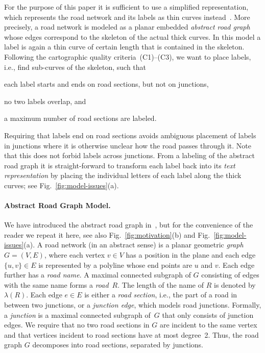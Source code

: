 \documentclass[a4paper,11pt]{article}
\begin{document}
For the purpose of this paper it is sufficient to use a simplified representation, which represents the road network
and its labels as thin curves instead~\cite{rlTheory}. More precisely, a road
network is modeled as a planar embedded \emph{abstract road graph} whose edges
correspond to the skeleton of the actual thick curves.  In this model a
label is again a thin curve of certain length that is contained in the
skeleton. Following the cartographic quality criteria~(C1)--(C3),
we want to place labels, i.e., find sub-curves of the skeleton,
such that
\begin{inparaenum}[(1)]
\item each label starts and ends on road sections, but not on junctions,
\item no two labels overlap, and
\item a maximum number of road sections are labeled. \end{inparaenum}
Requiring that labels end on road sections avoids ambiguous placement
of labels in junctions where it is otherwise unclear how the road passes through
it. Note that this does not forbid labels across junctions. From a
labeling of the abstract road graph it is straight-forward to
transform each label back into its \emph{text representation} by
placing the individual letters of each label along the thick curves; see
Fig.~\ref{fig:model-issues}(a).


\paragraph{Abstract Road Graph Model.}
We have introduced the abstract road graph in~\cite{rlTheory}, but for
the convenience of the reader we repeat it here, see also
Fig.~\ref{fig:motivation}(b) and Fig.~\ref{fig:model-issues}(a).   A road
network (in an abstract sense) is a planar geometric \emph{graph}
$G=(V,E)$, where each vertex $v\in V$ has a position in the plane and
each edge~$\{u,v\}\in E$ is represented by a polyline whose end points
are $u$ and $v$.  Each edge further has a \emph{road name}. A
maximal connected subgraph of $G$ consisting of edges with the same name
forms a \emph{road}~$R$. The length of the name of $R$ is denoted by~$\lambda(R)$.
Each edge $e \in E$ is either a \emph{road section}, i.e., the part of a road in between two junctions, or a \emph{junction edge}, which
models road junctions. Formally, a \emph{junction} is a maximal connected
subgraph of~$G$ that only consists of junction edges. We require that no two road sections in $G$ are incident to the same vertex and that vertices incident to road sections have at
most degree~2. Thus, the road graph $G$ decomposes into road sections, separated by junctions.
\end{document}
